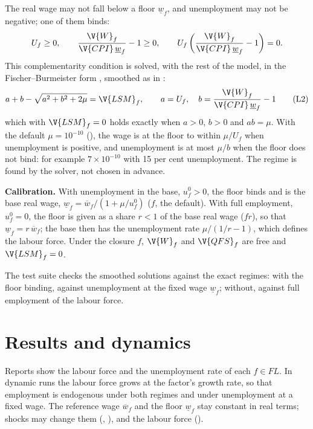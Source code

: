 The real wage may not fall below a floor $\underline{w}_f$, and unemployment
may not be negative; one of them binds:
\begin{equation*}
U_f \ge 0, \qquad \frac{\V{W}_f}{\V{CPI}\,\underline{w}_f} - 1 \ge 0,
\qquad U_f\left(\frac{\V{W}_f}{\V{CPI}\,\underline{w}_f} - 1\right) = 0 .
\end{equation*}
This complementarity condition is solved, with the rest of the model, in the
Fischer--Burmeister form \citep{fischer1992}, smoothed as in
\citet{kanzow1996}:
\begin{equation}
a + b - \sqrt{a^2 + b^2 + 2\mu} = \V{LSM}_f,
\qquad a = U_f, \quad b = \frac{\V{W}_f}{\V{CPI}\,\underline{w}_f} - 1
\tag{L2}\label{eq:L2}
\end{equation}
which with $\V{LSM}_f = 0$ holds exactly when $a > 0$, $b > 0$ and $ab = \mu$.
With the default $\mu = 10^{-10}$ (), the wage is at the floor
to within $\mu / U_f$ when unemployment is positive, and unemployment is at
most $\mu / b$ when the floor does not bind: for example $7 \times 10^{-10}$
with 15 per cent unemployment. The regime is found by the solver, not chosen
in advance.

\textbf{Calibration.} With unemployment in the base, $u^0_f > 0$, the floor
binds and is the base real wage, $\underline{w}_f = \overline{w}_f / (1 + \mu /
u^0_f)$ ($f$, the default). With full employment,
$u^0_f = 0$, the floor is given as a share $r < 1$ of the base real wage
($f$\cmd{:}$r$\cmd{)}), so that $\underline{w}_f = r\,\overline{w}_f$;
the base then has the unemployment rate $\mu / (1/r - 1)$, which defines the
labour force. Under the closure $f$, $\V{W}_f$
and $\V{QFS}_f$ are free and $\V{LSM}_f = 0$.

The test suite checks the smoothed solutions against the exact regimes: with
the floor binding, against unemployment at the fixed wage $\underline{w}_f$;
without, against full employment of the labour force.

\section{Results and dynamics}

Reports show the labour force and the unemployment rate of each $f \in FL$.
In dynamic runs the labour force grows at the factor's growth rate, so that
employment is endogenous under both regimes and under unemployment at a fixed
wage. The reference wage $\overline{w}_f$ and the floor $\underline{w}_f$ stay
constant in real terms; shocks may change them (, ), and
the labour force ().
